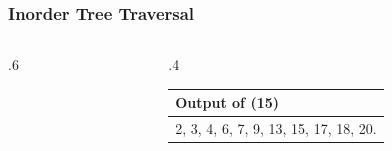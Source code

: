 \documentclass[10pt]{beamer}
\begin{document}
\begin{frame}[t]\frametitle{Inorder Tree Traversal}
	\begin{columns}[T] %
	\begin{column}{.6\linewidth} %
{\footnotesize 
		
} %

	\end{column} %
	\begin{column}{.4\linewidth} %

		{\small 
		
		} %


		{\footnotesize 
			\begin{tabular}{| l |}
			\hline
			Output of {\scriptsize \InorderTreeWalk(15)}\\
			\hline
			2, 3, 4, 6, 7, 9, 13, 15, 17, 18, 20.\\
			\hline
			\end{tabular}
		} %

	\end{column} %
	\end{columns} %
	
\end{frame}




\end{document}
